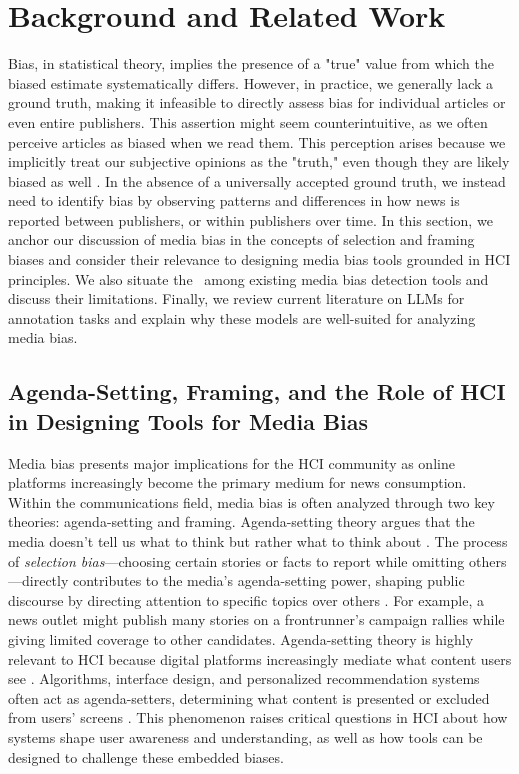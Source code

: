 \section{Background and Related Work}
\label{sec:related_work}

Bias, in statistical theory, implies the presence of a "true" value from which the biased estimate systematically differs. However, in practice, we generally lack a ground truth, making it infeasible to directly assess bias for individual articles or even entire publishers. This assertion might seem counterintuitive, as we often perceive articles as biased when we read them. This perception arises because we implicitly treat our subjective opinions as the "truth," even though they are likely biased as well \cite{pronin2004objectivity}. In the absence of a universally accepted ground truth, we instead need to identify bias by observing patterns and differences in how news is reported between publishers, or within publishers over time. In this section, we anchor our discussion of media bias in the concepts of selection and framing biases and consider their relevance to designing media bias tools grounded in HCI principles. We also situate the \mbd\ among existing media bias detection tools and discuss their limitations. Finally, we review current literature on LLMs for annotation tasks and explain why these models are well-suited for analyzing media bias. 

\subsection{Agenda-Setting, Framing, and the Role of HCI in Designing Tools for Media Bias}
\label{sec:related_work_media_bias}

Media bias presents major implications for the HCI community as online platforms increasingly become the primary medium for news consumption. Within the communications field, media bias is often analyzed through two key theories: agenda-setting and framing. Agenda-setting theory argues that the media doesn't tell us what to think but rather what to think about \cite{agenda_setting_1972, mccombs2005agenda}. The process of \emph{selection bias}---choosing certain stories or facts to report while omitting others---directly contributes to the media's agenda-setting power, shaping public discourse by directing attention to specific topics over others \cite{dearing1996agenda}. For example, a news outlet might publish many stories on a frontrunner's campaign rallies while giving limited coverage to other candidates. Agenda-setting theory is highly relevant to HCI because digital platforms increasingly mediate what content users see \cite{Naser2020RelevanceAC}. Algorithms, interface design, and personalized recommendation systems often act as agenda-setters, determining what content is presented or excluded from users' screens \cite{maudet,Eslami2016FirstI}. This phenomenon raises critical questions in HCI about how systems shape user awareness and understanding, as well as how tools can be designed to challenge these embedded biases.

